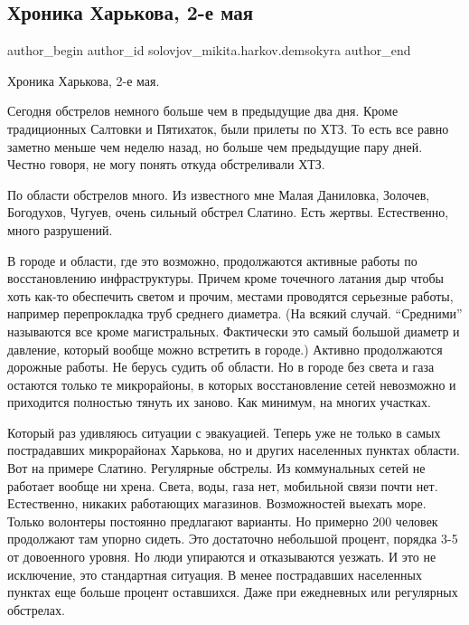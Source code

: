  
 
 
 
 
 
\subsection{Хроника Харькова, 2-е мая}
\label{sec:02_05_2022.fb.solovjov_mikita.harkov.demsokyra.1.hronika}
 
\ifcmt
 author_begin
   author_id solovjov_mikita.harkov.demsokyra
 author_end
\fi

Хроника Харькова, 2-е мая. 

Сегодня обстрелов немного больше чем в предыдущие два дня. Кроме традиционных
Салтовки и Пятихаток, были прилеты по ХТЗ. То есть все равно заметно меньше чем
неделю назад, но больше чем предыдущие пару дней. Честно говоря, не могу понять
откуда обстреливали ХТЗ.

По области обстрелов много. Из известного мне Малая Даниловка, Золочев,
Богодухов, Чугуев, очень сильный обстрел Слатино. Есть жертвы. Естественно,
много разрушений.

В городе и области, где это возможно, продолжаются активные работы по
восстановлению инфраструктуры. Причем кроме точечного латания дыр чтобы хоть
как-то обеспечить светом и прочим, местами проводятся серьезные работы,
например перепрокладка труб среднего диаметра. (На всякий случай. \enquote{Средними}
называются все кроме магистральных. Фактически это самый большой диаметр и
давление, который вообще можно встретить в городе.) Активно продолжаются
дорожные работы. Не берусь судить об области. Но в городе без света и газа
остаются только те микрорайоны, в которых восстановление сетей невозможно и
приходится полностью тянуть их заново. Как минимум, на многих участках.

Который раз удивляюсь ситуации с эвакуацией. Теперь уже не только в самых
пострадавших микрорайонах Харькова, но и других населенных пунктах области. Вот
на примере Слатино. Регулярные обстрелы. Из коммунальных сетей не работает
вообще ни хрена. Света, воды, газа нет, мобильной связи почти нет. Естественно,
никаких работающих магазинов. Возможностей выехать море. Только волонтеры
постоянно предлагают варианты. Но примерно 200 человек продолжают там упорно
сидеть. Это достаточно небольшой процент, порядка 3-5 от довоенного уровня. Но
люди упираются и отказываются уезжать. И это не исключение, это стандартная
ситуация. В менее пострадавших населенных пунктах еще больше процент
оставшихся. Даже при ежедневных или регулярных обстрелах.

